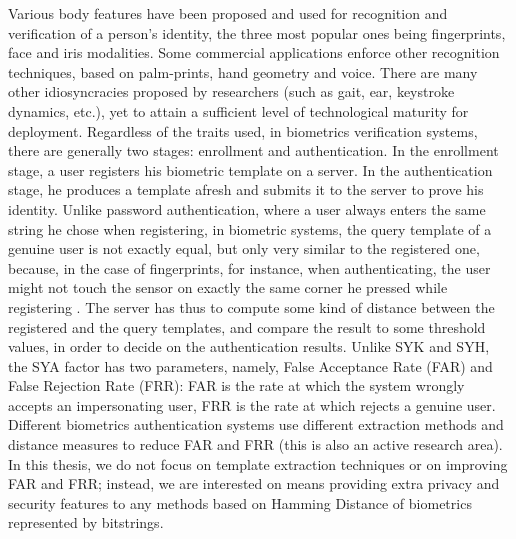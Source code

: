 Various body features have been proposed and used for recognition and
verification of a person's identity, the three most popular ones being fingerprints, face and
iris modalities. Some commercial applications enforce other recognition techniques, based on palm-prints, hand geometry and voice. There are many other idiosyncracies proposed by
researchers (such as gait, ear, keystroke dynamics, etc.), yet to attain a
sufficient level of technological maturity for deployment. Regardless of the
traits used, in biometrics verification systems, there are generally two stages:
enrollment and authentication. In the enrollment stage, a user registers his
biometric template on a server. In the authentication stage, he produces
a template afresh and submits it to the server to prove his identity. Unlike password
authentication, where a user always enters the same string he chose when
registering, in biometric systems, the query template of a genuine user is not exactly equal, but only very similar to the registered one, because, in the case of fingerprints, for instance, when
authenticating, the user might not touch the sensor on exactly the same corner he pressed while registering . The server has thus to compute some kind of distance between the
registered and the query templates, and compare the result to some threshold
values, in order to decide on the authentication results. Unlike SYK and SYH, the SYA
factor has two parameters, namely, False Acceptance Rate (FAR) and False
Rejection Rate (FRR): FAR is the rate at which the system wrongly accepts an
impersonating user, FRR is the rate at which rejects a genuine
user. Different biometrics authentication systems use different extraction
methods and distance measures to reduce FAR and FRR (this is also an active
research area). In this thesis, we do not focus on template extraction techniques
or on improving FAR and FRR; instead, we are interested on means providing extra
privacy and security features to any methods based on Hamming Distance
of biometrics represented by bitstrings.

